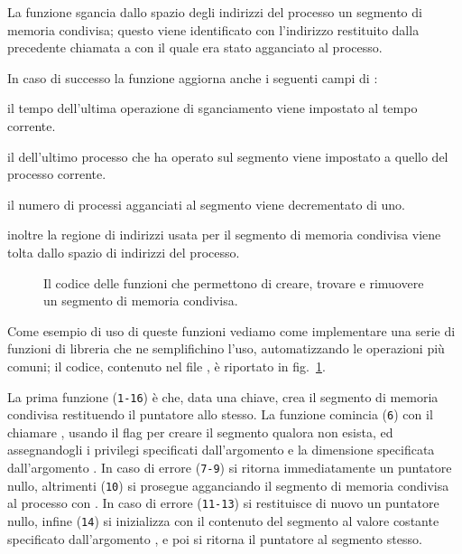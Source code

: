 La funzione sgancia dallo spazio degli indirizzi del processo un segmento di
memoria condivisa; questo viene identificato con l'indirizzo 
restituito dalla precedente chiamata a  con il quale era stato
agganciato al processo.

In caso di successo la funzione aggiorna anche i seguenti campi di
:
\begin{itemize*}
\item il tempo  dell'ultima operazione di sganciamento viene
  impostato al tempo corrente.
\item il   dell'ultimo processo che ha operato sul
  segmento viene impostato a quello del processo corrente.
\item il numero  di processi agganciati al segmento viene
  decrementato di uno.
\end{itemize*} 
inoltre la regione di indirizzi usata per il segmento di memoria condivisa
viene tolta dallo spazio di indirizzi del processo.

\begin{figure}[!htbp]
  \footnotesize \centering
  \begin{minipage}[c]{\codesamplewidth}
  \end{minipage} 
  \normalsize 
  \caption{Il codice delle funzioni che permettono di creare, trovare e
    rimuovere un segmento di memoria condivisa.}
  \label{fig:ipc_sysv_shm_func}
\end{figure}

Come esempio di uso di queste funzioni vediamo come implementare una serie di
funzioni di libreria che ne semplifichino l'uso, automatizzando le operazioni
più comuni; il codice, contenuto nel file , è riportato in
fig.~\ref{fig:ipc_sysv_shm_func}.

La prima funzione (\texttt{\small 1-16}) è  che, data una
chiave, crea il segmento di memoria condivisa restituendo il puntatore allo
stesso. La funzione comincia (\texttt{\small 6}) con il chiamare
, usando il flag  per creare il segmento
qualora non esista, ed assegnandogli i privilegi specificati dall'argomento
 e la dimensione specificata dall'argomento .  In
caso di errore (\texttt{\small 7-9}) si ritorna immediatamente un puntatore
nullo, altrimenti (\texttt{\small 10}) si prosegue agganciando il segmento di
memoria condivisa al processo con . In caso di errore
(\texttt{\small 11-13}) si restituisce di nuovo un puntatore nullo, infine
(\texttt{\small 14}) si inizializza con  il contenuto del
segmento al valore costante specificato dall'argomento , e poi si
ritorna il puntatore al segmento stesso.

